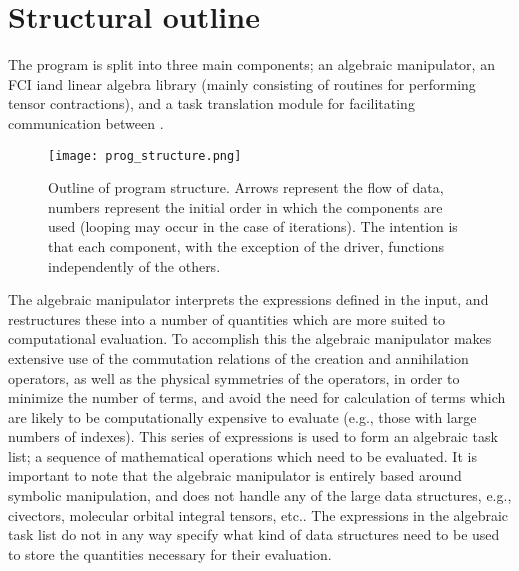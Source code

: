 \section*{Structural outline}
\noindent The program is split into three main components; an algebraic manipulator, an FCI
iand linear algebra library (mainly consisting of routines for performing tensor contractions),
and a task translation module for facilitating communication between .\\

\begin{figure}[!ht]
\begin{center}
\texttt{[image: prog\_structure.png]}
\caption{ Outline of program structure. Arrows represent the flow of data, numbers represent the
initial order in which the components are used (looping may occur in the case of iterations).
The intention is that each component, with the exception of the driver, functions independently of the others.}
\end{center}
\label{fig:prog_structure}
\end{figure}

\noindent The algebraic manipulator interprets the expressions defined
in the input, and restructures these into a number of quantities which are
more suited to computational evaluation. To accomplish this the
algebraic manipulator makes extensive use of the commutation
relations of the creation and annihilation operators, as well as the physical
symmetries of the operators, in order to minimize the number of terms, and
avoid the need for calculation of terms which are likely to be computationally
expensive to evaluate (e.g., those with large numbers of indexes). This series
of expressions is used to form an algebraic task list; a sequence of
mathematical operations which need to be evaluated.  It is important to note
that the algebraic manipulator is entirely based around symbolic manipulation,
and does not handle any of the large data structures, e.g., civectors,
molecular orbital integral tensors, etc.. The expressions in the algebraic
task list do not in any way specify what kind of data structures need to
be used to store the quantities necessary for their evaluation.\\

